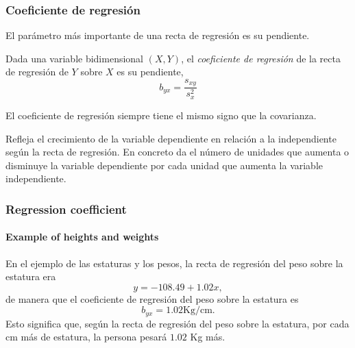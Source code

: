 \begin{frame}
\frametitle{Coeficiente de regresión}
El parámetro más importante de una recta de regresión es su pendiente.

\begin{definicion}
Dada una variable bidimensional $(X,Y)$, el \emph{coeficiente de regresión} de la recta de regresión de $Y$ sobre $X$ es su pendiente,
\[
b_{yx} = \frac{s_{xy}}{s_x^2} 
\]
\end{definicion}

El coeficiente de regresión siempre tiene el mismo signo que la covarianza.

Refleja el crecimiento de la variable dependiente en relación a la independiente según la recta de regresión. 
En concreto da el número de unidades que aumenta o disminuye la variable dependiente por cada unidad que aumenta la variable independiente.
\end{frame}

\begin{frame}
\frametitle{Regression coefficient}
\framesubtitle{Example of heights and weights}

En el ejemplo de las estaturas y los pesos, la recta de regresión del peso sobre la estatura era
\[
y=-108.49 +1.02 x,
\]
de manera que el coeficiente de regresión del peso sobre la estatura es 
\[
b_{yx}= 1.02 \mbox{Kg/cm.}
\]
Esto significa que, según la recta de regresión del peso sobre la estatura, por cada cm más de estatura, la persona pesará $1.02$ Kg más.

\begin{center}

\end{center}


\end{frame}


